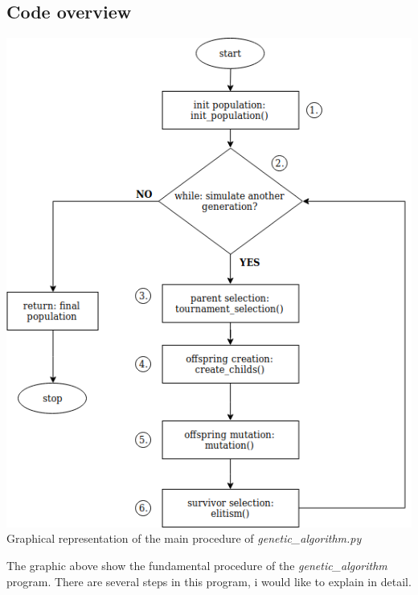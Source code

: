 \documentclass[10pt,a4paper]{article}
\begin{document}
	\subsection{Code overview}
	\begin{center}
		\includegraphics[width=0.9\linewidth]{pictures/geneticAlgorithm/genetic_algorithm}
		\\
		Graphical representation of the main procedure of \textit{genetic\_algorithm.py}
		\\
	\end{center}
	The graphic above show the fundamental procedure of the \textit{genetic\_algorithm} program. There are several steps in this program, i would like to explain in detail.\\
\end{document}
